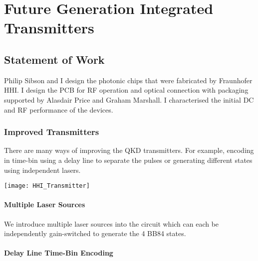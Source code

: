 %
%
\graphicspath{{./chapters/chapter06/fig06/}}

\let\textcircled=\pgftextcircled
\chapter{Future Generation Integrated Transmitters}
\label{chap:future}

\section*{Statement of Work}

Philip Sibson and I design the photonic chips that were fabricated by Fraunhofer HHI. I design the PCB for RF operation and optical connection with packaging supported by Alasdair Price and Graham Marshall. I characterised the initial DC and RF performance of the devices.

\subsection{Improved Transmitters}

There are many ways of improving the QKD transmitters. For example, encoding in time-bin using a delay line to separate the pulses or generating different states using independent lasers.

\begin{sidewaysfigure}
	\centering
	\texttt{[image: HHI\_Transmitter]}
	\caption[Latest generation InP QKD Transmitter]{Latest generation HHI indium phosphide transmitter. The \SI[product-units=power]{6x4}{mm} chip contains a few ways to create BB84 states for QKD. Firstly, we have designs to compare \ac{dfb} and \ac{DBR} lasers. Secondly, we can use a delay line to separate the time bins. Finally, we have multiplexed lasers to pulse independently lasers for each state.}
\end{sidewaysfigure}

\subsubsection*{Multiple Laser Sources}

We introduce multiple laser sources into the circuit which can each be independently gain-switched to generate the 4 BB84 states. 

\subsubsection*{Delay Line Time-Bin Encoding}

